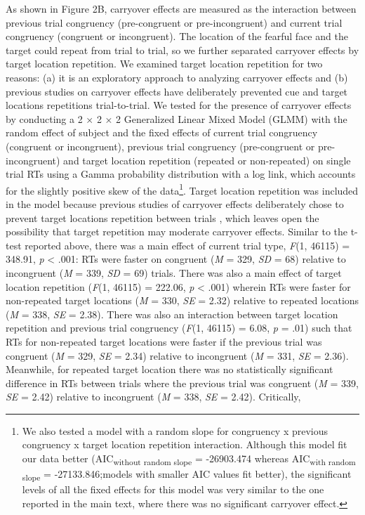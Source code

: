 \documentclass{article}
\begin{document}
	As shown in Figure 2B, carryover effects are measured as the interaction between previous trial congruency (pre-congruent or pre-incongruent) and current trial congruency (congruent or incongruent). The location of the fearful face and the target could repeat from trial to trial, so we further separated carryover effects by target location repetition. {\color{4472C4}We examined target location repetition for two reasons: (a) it is an exploratory approach to analyzing carryover effects and (b) previous studies on carryover effects }\textcite{[object Object]}{\color{4472C4} have deliberately prevented cue and target locations repetitions trial-to-trial. }We tested for the presence of carryover effects by conducting a 2 × 2 × 2 Generalized Linear Mixed Model (GLMM) {\color{4472C4}with the random effect of subject} and the fixed effects of current trial congruency (congruent or incongruent), previous trial congruency (pre-congruent or pre-incongruent) and target location repetition (repeated or non-repeated) on {\color{4472C4}single trial} RTs using a Gamma probability distribution with a log link, which accounts for the slightly positive skew of the data\footnote{{\color{4472C4} }{\color{4472C4}We also tested a model with a random slope for congruency x previous congruency x target location repetition interaction. Although }{\color{4472C4}this}{\color{4472C4} model fit our data better (AIC}\textsubscript{{\color{4472C4}without random slope}}{\color{4472C4} = -26903.474 whereas AIC}\textsubscript{{\color{4472C4}with random slope}}{\color{4472C4} = -27133.846}{\color{4472C4};}{\color{4472C4}models with smaller AIC values fit better), the significant levels of all the fixed effect}{\color{4472C4}s}{\color{4472C4} for this model was very similar to the one reported in the main text, where there was no significant carryover effect.}}. Target location repetition was included in the model because previous studies of carryover effects deliberately chose to prevent target locations repetition between trials \textcite{[object Object]}, which leaves open the possibility that target repetition may moderate carryover effects. Similar to the t-test reported above, there was a main effect of current trial type, \emph{F}(1, 46115) = 348.91, \emph{p }< .001: RTs were faster on congruent (\emph{M }= 329, \emph{SD}\emph{ }= 68) relative to incongruent (\emph{M }= 339, \emph{SD }= 69) trials. There was also a main effect of target location repetition (\emph{F}(1, 46115) = 222.06, \emph{p }< .001) wherein RTs were faster for non-repeated target locations ({\color{4472C4}\emph{M}}\emph{ }= 330, \emph{SE }= 2.32) relative to repeated locations ({\color{4472C4}\emph{M}}\emph{ }= 338, \emph{SE }= 2.38). There was also an interaction between target location repetition and previous trial congruency (\emph{F}(1, 46115) = 6.08, \emph{p }= .01) such that RTs for non-repeated target locations were faster if the previous trial was congruent (\emph{M }= 329, \emph{SE }= 2.34) relative to incongruent (\emph{M }= 331, \emph{SE }= 2.36). Meanwhile, for repeated target location there was {\color{4472C4}no statistically significant difference }in RTs between trials where the previous trial was congruent (\emph{M }= 339, \emph{SE }= 2.42) relative to incongruent (\emph{M }= 338, \emph{SE }= 2.42). Critically, 
\end{document}

